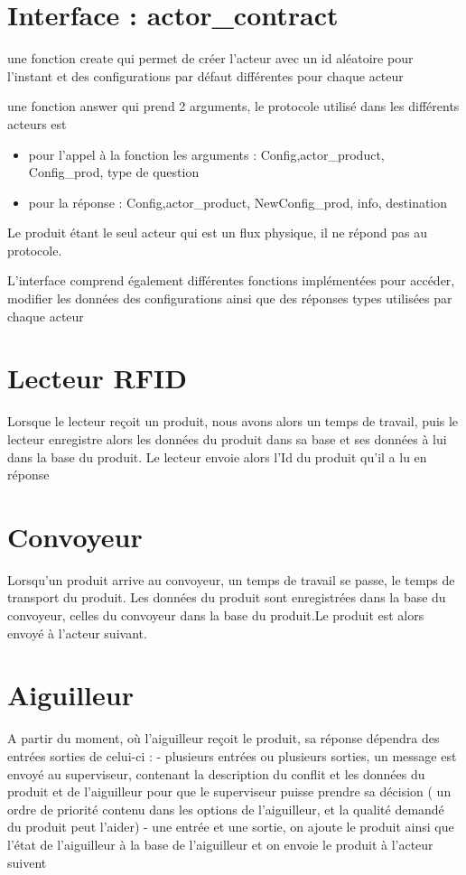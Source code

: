 	\section{Interface : actor_contract}

	 une fonction create qui permet de créer l'acteur avec un id aléatoire pour l'instant et des configurations par défaut différentes pour chaque acteur
	
	 une fonction answer qui prend 2 arguments, le protocole utilisé dans les différents acteurs est 
	\begin{itemize}
	
	 \item pour l'appel à la fonction les arguments : {Config,{actor\_product, Config\_prod, type de 				question}}
	\item pour la réponse : {Config,{actor\_product, NewConfig\_prod, info}, destination}

	\end{itemize}
	 Le produit étant le seul acteur qui est un flux physique, il ne répond pas au protocole. 
	 
	 L'interface comprend également différentes fonctions implémentées pour accéder, modifier les données des configurations ainsi que des réponses types utilisées par chaque acteur
	 
	 \section{Lecteur RFID}
	 Lorsque le lecteur reçoit un produit, nous avons alors un temps de travail, puis le lecteur enregistre alors les données du produit dans sa base et ses données à lui dans la base du produit. Le lecteur envoie alors l'Id du produit qu'il a lu en réponse
	 
	 \section{Convoyeur}
	Lorsqu'un produit arrive au convoyeur, un temps de travail se passe, le temps de transport du produit. Les données du produit sont enregistrées dans la base du convoyeur, celles du convoyeur dans la base du produit.Le produit est alors envoyé à l'acteur suivant.

	\section{Aiguilleur}
	A partir du moment, où l'aiguilleur reçoit le produit, sa réponse dépendra des entrées sorties de celui-ci : 
	- plusieurs entrées ou plusieurs sorties, un message est envoyé au superviseur, contenant la description du conflit et les données du produit et de l'aiguilleur pour que le superviseur puisse prendre sa décision ( un ordre de priorité contenu dans les options de l'aiguilleur, et la qualité demandé du produit peut l'aider)
	- une entrée et une sortie, on ajoute le produit ainsi que l'état de l'aiguilleur à la base de l'aiguilleur et on envoie le produit à l'acteur suivent
	
